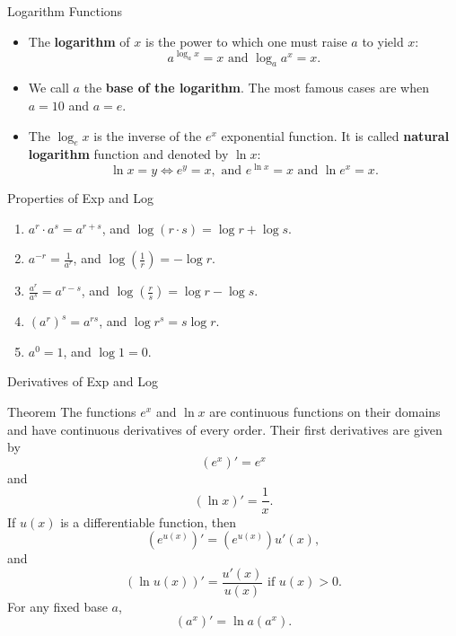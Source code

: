 \documentclass{beamer}
\begin{document}
\begin{frame}{Logarithm Functions}
\begin{itemize}
    \item The \textbf{logarithm }of $x$ is the power to which one must raise $a$ to yield $x$:
    \[a^{\log_{a}{x}}=x \text{ and }\log_{a}{a^x}=x.
    \]
    \item We call $a$ the \textbf{base of the logarithm}. The most famous cases are when $a=10$ and $a=e$. 
    \item The $\log_ex$ is the inverse of the $e^x$ exponential function. It is called \textbf{natural logarithm} function and denoted by $\ln x$:
    \[\ln x=y \iff e^y=x, \text{ and }e^{\ln x}=x \text{ and } \ln e^x=x.
    \]
    
\end{itemize}
    
\end{frame}
\begin{frame}{Properties of Exp and Log}
\begin{enumerate}
    \item $a^r\cdot a^s=a^{r+s}$, and $\log (r\cdot s)=\log r+\log s$.
    \item $a^{-r}=\frac{1}{a^r}$, and $\log (\frac{1}{r})=-\log r. $
    \item $\frac{a^r}{a^s}=a^{r-s}$, and $\log (\frac{r}{s})=\log r -\log s$.
    \item $(a^r)^s=a^{rs}$, and $\log r^s=s \log r$. 
    \item $a^0=1$, and $\log 1=0$.
\end{enumerate}
    
\end{frame}

\begin{frame}{Derivatives of Exp and Log}
\begin{block}{Theorem}
The functions $e^x$ and $\ln x$ are continuous functions on their domains and have continuous derivatives of every order. Their first derivatives are given by 
\[(e^x)'=e^x
\] and 
\[(\ln x)'=\frac{1}{x}.
\]
If $u(x)$ is a differentiable function, then 
\[(e^{u(x)})'=(e^{u(x)})u'(x), 
\]
 and 
 \[(\ln u(x))'=\frac{u'(x)}{u(x)} \text{ if } u(x)>0.
 \]
 For any fixed base $a$, 
 \[(a^x)'=\ln a (a^x).
 \]
\end{block}
    
\end{frame}
\end{document}
